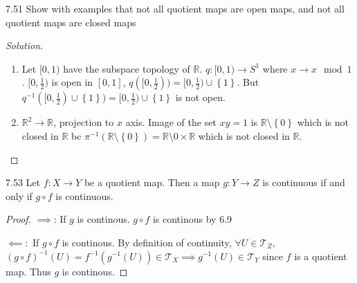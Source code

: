 \documentclass{article}
\newcommand*{\T}{\mathcal{T}}
\newcommand{\R}{\mathbb{R}}
\newenvironment{solution}
{\renewcommand\qedsymbol{$\blacksquare$}\begin{proof}[Solution]}
{\end{proof}}
\begin{document}
\begin{PROB}{7.51}\label{Problem 7.51.}
    Show with examples that not all quotient maps are open maps, and not all quotient maps are closed maps
\end{PROB}
\begin{solution}
    \begin{enumerate}
        \item Let $[0, 1)$ have the subspace topology of $\R$. $q: [0, 1) \to S^1$ where $x \to x \mod 1$. $[0, \frac{1}{2})$ is open in $[0, 1]$, $q([0, \frac{1}{2})) = [0, \frac{1}{2}) \cup \left\{ 1 \right\}$. But $q^{-1}([0, \frac{1}{2}) \cup \left\{ 1 \right\}) = [0, \frac{1}{2}) \cup \left\{ 1 \right\}$ is not open. 
        \item $\R^2 \to \R$, projection to $x$ axis. Image of the set $xy  = 1$ is $\R \setminus \left\{ 0 \right\}$ which is not closed in $\R$ bc $\pi^{-1}(\R \setminus \left\{ 0 \right\}) = \R \setminus {0} \times \R$ which is not closed in $\R$.         
    \end{enumerate}
\end{solution}

\bigskip

\begin{claim}{7.53}\label{Claim 7.53.}
    Let $f: X \to Y$ be a quotient map. Then a map $g: Y \to Z$ is continuous if and only if $g \circ f$ is continuous.
\end{claim}
\begin{proof}
    $\implies$: If $g$ is continous. $g \circ f$ is continous by 6.9
    
    $\impliedby:$ If $g \circ f$ is continous. By definition of continuity, $\forall U \in \T_Z$, $(g \circ f)^{-1}(U)= f^{-1}(g^{-1}(U)) \in \T_X \implies g^{-1}(U) \in \T_Y$ since $f$ is a quotient map. Thus $g$ is continous.   
\end{proof}

\pagebreak
\end{document}
